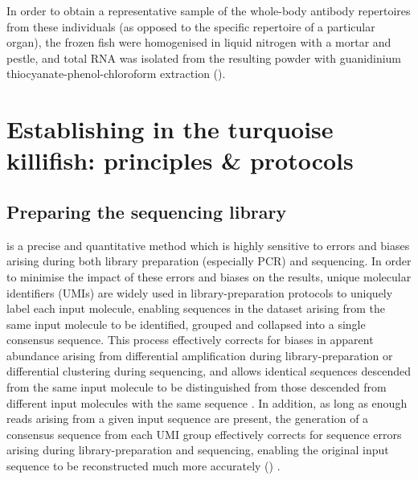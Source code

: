 In order to obtain a representative sample of the whole-body antibody repertoires from these individuals (as opposed to the specific repertoire of a particular organ), the frozen fish were homogenised in liquid nitrogen with a mortar and pestle, and total RNA was isolated from the resulting powder with guanidinium thiocyanate-phenol-chloroform extraction ().

\section{Establishing \igseq in the turquoise killifish: principles \& protocols}
\label{sec:igseq_protocol}

\subsection{Preparing the sequencing library}
\label{sec:igseq_protocol_library}

\IGSEQ is a precise and quantitative method which is highly sensitive to errors and biases arising during both library preparation (especially PCR) and sequencing. In order to minimise the impact of these errors and biases on the results, unique molecular identifiers (UMIs) are widely used in \igseq library-preparation protocols \parencite{vollmers2013consensus,turchaninova2016igprep} to uniquely label each input molecule, enabling sequences in the dataset arising from the same input molecule to be identified, grouped and collapsed into a single consensus sequence. This process effectively corrects for biases in apparent abundance arising from differential amplification during library-preparation or differential clustering during sequencing, and allows identical sequences descended from the same input molecule to be distinguished from those descended from different input molecules with the same sequence \parencite{vollmers2013consensus}. In addition, as long as enough reads arising from a given input sequence are present, the generation of a consensus sequence from each UMI group effectively corrects for sequence errors arising during library-preparation and sequencing, enabling the original input sequence to be reconstructed much more accurately () \parencite{vollmers2013consensus,turchaninova2016igprep}.

